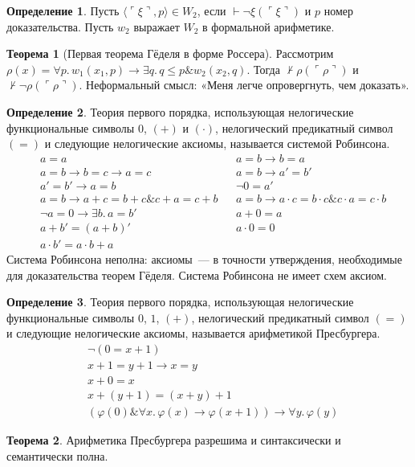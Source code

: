 \documentclass[a4paper,11pt]{article}
\theoremstyle{definition}
\newtheorem*{thm}{Теорема}
\newtheorem*{dfn}{Определение}
\newcommand{\proves}{\vdash}
\newcommand{\amp}{\mathbin{\&}}
\newcommand{\gn}[1]{\ulcorner #1 \urcorner}
\begin{document}
\begin{dfn}
Пусть $\langle\gn{\xi}, p\rangle \in W_2$, если $\proves \neg\xi(\gn{\xi})$ и $p$
номер доказательства. Пусть $w_2$ выражает $W_2$ в формальной арифметике.
\end{dfn}
\begin{thm}[Первая теорема Гёделя в форме Россера]
Рассмотрим $\rho(x) = \forall p.\,w_1(x_1, p) \to \exists q.\,q \le p \amp
w_2(x_2, q)$. Тогда $\nvdash \rho(\gn{\rho})$ и $\nvdash \neg\rho(\gn{\rho})$.
Неформальный смысл: «Меня легче опровергнуть, чем доказать».
\end{thm}
\begin{dfn}
Теория первого порядка, использующая нелогические функциональные символы $0$,
$(+)$ и $(\cdot)$, нелогический предикатный символ $(=)$ и следующие
нелогические аксиомы, называется системой Робинсона.
\begin{align*}
&a = a & &a = b \to b = a\\
&a = b \to b = c \to a = c & &a = b \to a' = b'\\
&a' = b' \to a = b & &\neg 0 = a'\\
&a = b \to a + c = b + c \amp c + a = c + b & &a = b \to a \cdot c = b \cdot c \amp c \cdot a = c \cdot b\\
&\neg a = 0 \to \exists b.\,a = b' & &a + 0 = a\\
&a + b' = (a + b)' & &a \cdot 0 = 0\\
&a \cdot b' = a \cdot b + a
\end{align*}
Система Робинсона неполна: аксиомы~--- в точности утверждения, необходимые для
доказательства теорем Гёделя. Система Робинсона не имеет схем аксиом.
\end{dfn}
\begin{dfn}
Теория первого порядка, использующая нелогические функциональные символы $0$,
$1$, $(+)$, нелогический предикатный символ $(=)$ и следующие нелогические
аксиомы, называется арифметикой Пресбургера.
\begin{align*}
&\neg(0 = x + 1)\\
&x + 1 = y + 1 \to x = y\\
&x + 0 = x\\
&x + (y + 1) = (x + y) + 1\\
&(\varphi(0) \amp \forall x.\,\varphi(x) \to \varphi(x + 1)) \to \forall y.\,\varphi(y)
\end{align*}
\end{dfn}
\begin{thm}
Арифметика Пресбургера разрешима и синтаксически и семантически полна.
\end{thm}
\end{document}

